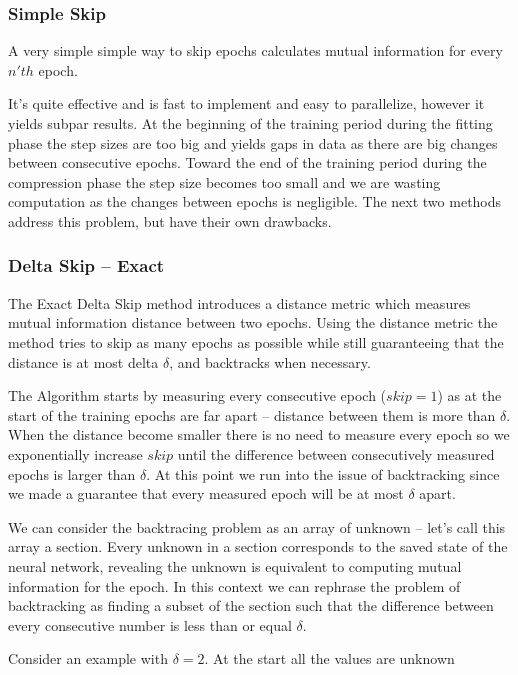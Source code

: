 \documentclass[dissertation.tex]{subfiles}
\begin{document}
\subsubsection{Simple Skip}
  
  A very simple simple way to skip epochs calculates mutual information for
  every $n'th$ epoch.

  It's quite effective and is fast to implement and easy to parallelize, however
  it yields subpar results. At the beginning of the training period during the
  fitting phase the step sizes are too big and yields gaps in data as there are
  big changes between consecutive epochs. Toward the end of the training period
  during the compression phase the step size becomes too small and we are
  wasting computation as the changes between epochs is negligible. The next two
  methods address this problem, but have their own drawbacks.

\subsubsection{Delta Skip -- Exact}

  The Exact Delta Skip method introduces a distance metric which measures
  mutual information distance between two epochs. Using the distance metric the
  method tries to skip as many epochs as possible while still guaranteeing that
  the distance is at most delta $\delta$, and backtracks when necessary.

  The Algorithm starts by measuring every consecutive epoch ($skip = 1$) as at
  the start of the training epochs are far apart -- distance between them is
  more than $\delta$. When the distance become smaller there is no need to
  measure every epoch so we exponentially increase $skip$ until the difference
  between consecutively measured epochs is larger than $\delta$. At this point
  we run into the issue of backtracking since we made a guarantee that every
  measured epoch will be at most $\delta$ apart.

  We can consider the backtracing problem as an array of unknown -- let's call
  this array a section. Every unknown in a section corresponds to the saved
  state of the neural network, revealing the unknown is equivalent to computing
  mutual information for the epoch. In this context we can rephrase the problem
  of backtracking as finding a subset of the section such that the difference
  between every consecutive number is less than or equal $\delta$.

  Consider an example with $\delta = 2$.
  At the start all the values are unknown 
\end{document}
